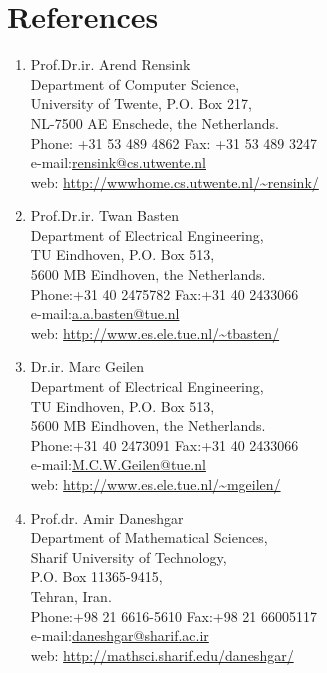 \section{\bf References}
\begin{enumerate}
\item Prof.Dr.ir. Arend Rensink\\
Department of Computer Science, \\
University of Twente, P.O. Box 217, \\
NL-7500 AE Enschede,
the Netherlands. \\
Phone: +31 53 489 4862 \hspace*{1cm} Fax: +31 53 489 3247 \\
e-mail:\url{rensink@cs.utwente.nl}  \\
web: \url{http://wwwhome.cs.utwente.nl/~rensink/}

\item Prof.Dr.ir. Twan Basten\\
Department of Electrical Engineering, \\
TU Eindhoven, P.O. Box 513, \\
5600 MB Eindhoven,
the Netherlands.\\
Phone:+31 40 2475782  \hspace*{1cm}    Fax:+31 40 2433066   \\
  e-mail:\url{a.a.basten@tue.nl} \\
web: \url{http://www.es.ele.tue.nl/~tbasten/}

\item Dr.ir. Marc Geilen\\
Department of Electrical Engineering, \\
TU Eindhoven, P.O. Box 513, \\
5600 MB Eindhoven,
the Netherlands.\\
Phone:+31 40 2473091  \hspace*{1cm}    Fax:+31 40 2433066   \\
  e-mail:\url{M.C.W.Geilen@tue.nl
} \\
web: \url{http://www.es.ele.tue.nl/~mgeilen/}

\item Prof.dr. Amir Daneshgar\\
Department of Mathematical Sciences,\\
Sharif University of Technology,\\
P.O. Box 11365-9415,\\
Tehran, Iran.\\
Phone:+98 21 6616-5610 \hspace*{1cm}    Fax:+98 21 66005117 \\
e-mail:\url{daneshgar@sharif.ac.ir}\\
web: \url{http://mathsci.sharif.edu/daneshgar/}

\end{enumerate}
